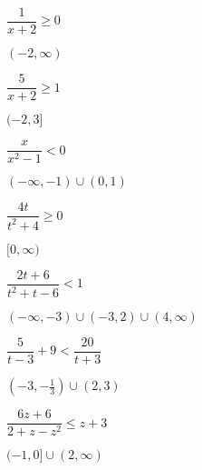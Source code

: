 \documentclass{ximera}
\begin{document}
\begin{question}
$\dfrac{1}{x + 2} \geq 0$
\begin{solution}
$(-2, \infty)$
\end{solution}

\end{question}

\begin{question}
$\dfrac{5}{x + 2} \geq 1$
\begin{solution}
$(-2, 3]$

\end{solution}

\end{question}

\begin{question}
$\dfrac{x}{x^{2} - 1} <  0$

\begin{solution}
$(-\infty, -1) \cup (0, 1)$
\end{solution}

\end{question}

\begin{question}
$\dfrac{4t}{t^2+4} \geq 0$
\begin{solution}
$[0, \infty)$

\end{solution}

\end{question}

\begin{question}
$\dfrac{2t+6}{t^2+t-6} < 1$
\begin{solution}
$(-\infty, -3) \cup (-3,2) \cup (4, \infty)$
\end{solution}

\end{question}

\begin{question}
$\dfrac{5}{t-3} + 9 < \dfrac{20}{t+3}$

\begin{solution}
$\left(-3, -\frac{1}{3} \right) \cup (2,3)$

\end{solution}

\end{question}

\begin{question}
$\dfrac{6z+6}{2+z-z^2} \leq z+3$
\begin{solution}
$(-1,0] \cup (2, \infty)$
\end{solution}

\end{question}
\end{document}
